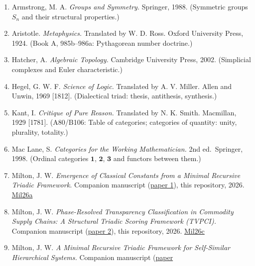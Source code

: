 \documentclass[
  11pt,
  letterpaper,
]{article}
\providecommand{\tightlist}{%
  \setlength{\itemsep}{0pt}\setlength{\parskip}{0pt}}
\begin{document}
\begin{enumerate}
\def\labelenumi{\arabic{enumi}.}
\tightlist
\item
  Armstrong, M. A. \emph{Groups and Symmetry.} Springer, 1988.
  (Symmetric groups \(S_n\) and their structural properties.)
\item
  Aristotle. \emph{Metaphysics.} Translated by W. D. Ross. Oxford
  University Press, 1924. (Book A, 985b--986a: Pythagorean number
  doctrine.)
\item
  Hatcher, A. \emph{Algebraic Topology.} Cambridge University Press,
  2002. (Simplicial complexes and Euler characteristic.)
\item
  Hegel, G. W. F. \emph{Science of Logic.} Translated by A. V. Miller.
  Allen and Unwin, 1969 {[}1812{]}. (Dialectical triad: thesis,
  antithesis, synthesis.)
\item
  Kant, I. \emph{Critique of Pure Reason.} Translated by N. K. Smith.
  Macmillan, 1929 {[}1781{]}. (A80/B106: Table of categories; categories
  of quantity: unity, plurality, totality.)
\item
  Mac Lane, S. \emph{Categories for the Working Mathematician.} 2nd
  ed.~Springer, 1998. (Ordinal categories \(\mathbf{1}\),
  \(\mathbf{2}\), \(\mathbf{3}\) and functors between them.)
\item
  Milton, J. W. \emph{Emergence of Classical Constants from a Minimal
  Recursive Triadic Framework.} Companion manuscript
  (\href{https://github.com/baardev/truevalue/blob/main/docnav/Research/papers/1_recursive-tholonic-five-constants/1_recursive-tholonic-five-constants.pdf}{paper
  1}), this repository, 2026.
  \href{https://github.com/baardev/truevalue/blob/main/docnav/Research/papers/1_recursive-tholonic-five-constants/1_recursive-tholonic-five-constants.pdf}{Mil26a}
\item
  Milton, J. W. \emph{Phase-Resolved Transparency Classification in
  Commodity Supply Chains: A Structural Triadic Scoring Framework
  (TVPCI).} Companion manuscript
  (\href{https://github.com/baardev/truevalue/blob/main/docnav/Research/papers/2_supply-chain-transparency-tvpci/2_supply-chain-transparency-tvpci.pdf}{paper
  2}), this repository, 2026.
  \href{https://github.com/baardev/truevalue/blob/main/docnav/Research/papers/2_supply-chain-transparency-tvpci/2_supply-chain-transparency-tvpci.pdf}{Mil26c}
\item
  Milton, J. W. \emph{A Minimal Recursive Triadic Framework for
  Self-Similar Hierarchical Systems.} Companion manuscript
  (\href{https://github.com/baardev/truevalue/blob/main/docnav/Research/papers/3_minimal-recursive-triadic-framework/3_minimal-recursive-triadic-framework.pdf}{paper
}
\end{enumerate}
\end{document}
